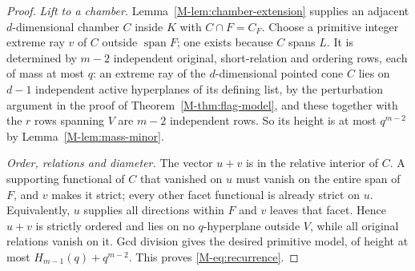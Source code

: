 \documentclass[10pt,a4paper]{amsart}
\newcommand{\spn}{\operatorname{span}}
\begin{document}
\begin{proof}
\smallskip\noindent\emph{Lift to a chamber.}
Lemma~\ref{M-lem:chamber-extension} supplies an adjacent $d$-dimensional
chamber $C$ inside $K$ with $C\cap F=C_F$. Choose a primitive integer extreme
ray $v$ of $C$ outside $\spn F$; one exists because $C$ spans $L$. It is
determined by $m-2$ independent original, short-relation and ordering rows,
each of mass at most $q$: an extreme ray of the $d$-dimensional pointed
cone $C$ lies on $d-1$ independent active hyperplanes of its defining list,
by the perturbation argument in the proof of Theorem~\ref{M-thm:flag-model},
and these together with the $r$ rows spanning $V$ are $m-2$ independent
rows. So its height is at most $q^{m-2}$ by Lemma~\ref{M-lem:mass-minor}.

\smallskip\noindent\emph{Order, relations and diameter.}
The vector $u+v$ is in the relative interior of $C$. A supporting functional
of $C$ that vanished on $u$ must vanish on the entire span of $F$, and $v$
makes it strict; every other facet functional is already strict on $u$.
Equivalently, $u$ supplies all directions within $F$ and $v$ leaves that
facet. Hence $u+v$ is strictly ordered and lies on no $q$-hyperplane outside
$V$, while all original relations vanish on it. Gcd division gives the
desired primitive model, of height at most $H_{m-1}(q)+q^{m-2}$. This proves
\eqref{M-eq:recurrence}.
\end{proof}
\end{document}
